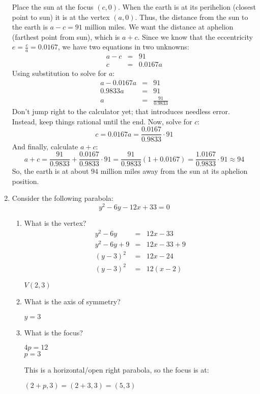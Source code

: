 \documentclass[letterpaper,12pt,fleqn]{article}
\begin{document}
\begin{enumerate}
  Place the sun at the focus $(c,0)$. When the earth is at its perihelion
  (closest point to sun) it is at the vertex $(a,0)$. Thus, the distance from
  the sun to the earth is $a-c=91$ million miles. We want the distance at
  aphelion (farthest point from sun), which is $a+c$. Since we know that the
  eccentricity $e=\frac{c}{a}=0.0167$, we have two equations in two unknowns:
  \begin{eqnarray*}
    a-c &=& 91 \\
    c &=& 0.0167a
  \end{eqnarray*}
  Using substitution to solve for $a$:
  \begin{eqnarray*}
    a-0.0167a &=& 91 \\
    0.9833a &=& 91 \\
    a &=& \frac{91}{0.9833}
  \end{eqnarray*}
  Don't jump right to the calculator yet; that introduces needless error.
  Instead, keep things rational until the end. Now, solve for $c$:
  \[c=0.0167a=\frac{0.0167}{0.9833}\cdot91\]
  And finally, calculate $a+c$:
  \[a+c=\frac{91}{0.9833}+\frac{0.0167}{0.9833}\cdot91=
  \frac{91}{0.9833}(1+0.0167)=\frac{1.0167}{0.9833}\cdot91\approx94\]
  So, the earth is at about $94$ million miles away from the sun at its
  aphelion position.

\item Consider the following parabola:
  \[y^2-6y-12x+33=0\]
  \begin{enumerate}
  \item What is the vertex?
    \begin{eqnarray*}
      y^2-6y &=& 12x-33 \\
      y^2-6y+9 &=& 12x-33+9 \\
      (y-3)^2 &=& 12x-24 \\
      (y-3)^2 &=& 12(x-2)
    \end{eqnarray*}

    $V(2,3)$
    
  \item What is the axis of symmetry?

    $y=3$
    
  \item What is the focus?

    $4p=12$ \\
    $p=3$

    This is a horizontal/open right parabola, so the focus is at:

    $(2+p,3)=(2+3,3)=(5,3)$


\end{enumerate}
\end{enumerate}
\end{document}
